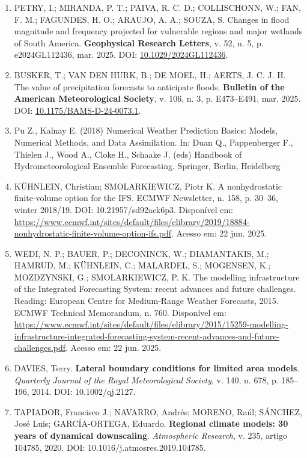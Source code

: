 \documentclass[12pt,a4paper,oneside]{book}
\begin{document}
\begin{enumerate}
\item
  PETRY, I.; MIRANDA, P. T.; PAIVA, R. C. D.; COLLISCHONN, W.; FAN, F. M.; FAGUNDES, H. O.; ARAUJO, A. A.; SOUZA, S. Changes in flood magnitude and frequency projected for vulnerable regions and major wetlands of South America. \textbf{Geophysical Research Letters}, v. 52, n. 5, p. e2024GL112436, mar. 2025. DOI: \href{https://doi.org/10.1029/2024GL112436}{10.1029/2024GL112436}.
\item
  BUSKER, T.; VAN DEN HURK, B.; DE MOEL, H.; AERTS, J. C. J. H. The value of precipitation forecasts to anticipate floods. \textbf{Bulletin of the American Meteorological Society}, v. 106, n. 3, p. E473--E491, mar. 2025. DOI: \href{https://doi.org/10.1175/BAMS-D-24-0073.1}{10.1175/BAMS-D-24-0073.1}.
\item
  Pu Z., Kalnay E. (2018) Numerical Weather Prediction Basics: Models, Numerical Methods, and Data Assimilation. In: Duan Q., Pappenberger F., Thielen J., Wood A., Cloke H., Schaake J. (eds) Handbook of Hydrometeorological Ensemble Forecasting. Springer, Berlin, Heidelberg
\item
  KÜHNLEIN, Christian; SMOLARKIEWICZ, Piotr K. A nonhydrostatic finite-volume option for the IFS. ECMWF Newsletter, n. 158, p. 30--36, winter 2018/19. DOI: 10.21957/sd92ack6p3. Disponível em: \url{https://www.ecmwf.int/sites/default/files/elibrary/2019/18884-nonhydrostatic-finite-volume-option-ifs.pdf}. Acesso em: 22 jun. 2025.
\item
  WEDI, N. P.; BAUER, P.; DECONINCK, W.; DIAMANTAKIS, M.; HAMRUD, M.; KÜHNLEIN, C.; MALARDEL, S.; MOGENSEN, K.; MOZDZYNSKI, G.; SMOLARKIEWICZ, P. K. The modelling infrastructure of the Integrated Forecasting System: recent advances and future challenges. Reading: European Centre for Medium-Range Weather Forecasts, 2015. ECMWF Technical Memorandum, n. 760. Disponível em: \url{https://www.ecmwf.int/sites/default/files/elibrary/2015/15259-modelling-infrastructure-integrated-forecasting-system-recent-advances-and-future-challenges.pdf}. Acesso em: 22 jun. 2025.
\item
  DAVIES, Terry. \textbf{Lateral boundary conditions for limited area models}. \emph{Quarterly Journal of the Royal Meteorological Society}, v. 140, n. 678, p. 185--196, 2014. DOI: 10.1002/qj.2127.
\item
  TAPIADOR, Francisco J.; NAVARRO, Andrés; MORENO, Raúl; SÁNCHEZ, José Luis; GARCÍA-ORTEGA, Eduardo. \textbf{Regional climate models: 30 years of dynamical downscaling}. \emph{Atmospheric Research}, v. 235, artigo 104785, 2020. DOI: 10.1016/j.atmosres.2019.104785.

\end{enumerate}
\end{document}
